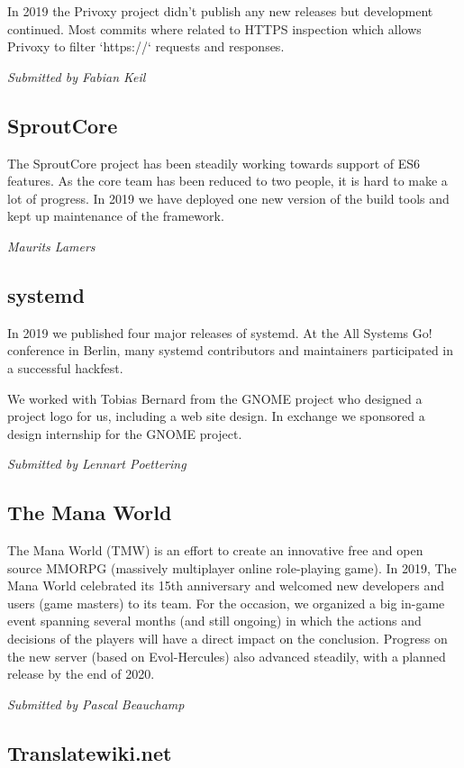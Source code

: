 \documentclass[a4paper]{report}
\begin{document}
In 2019 the Privoxy project didn't publish any new releases but
development continued. Most commits where related to HTTPS inspection
which allows Privoxy to filter `https://` requests and responses.

{\em Submitted by Fabian Keil}

\subsection{SproutCore}

The SproutCore project has been steadily working towards support of ES6
features.  As the core team has been reduced to two people, it is hard
to make a lot of progress.  In 2019 we have deployed one new version of
the build tools and kept up maintenance of the framework.

{\em Maurits Lamers }

\subsection{systemd}

In 2019 we published four major releases of systemd. At the All Systems
Go! conference in Berlin, many systemd contributors and maintainers
participated in a successful hackfest.

We worked with Tobias Bernard from the GNOME project who designed a
project logo for us, including a web site design. In exchange we
sponsored a design internship for the GNOME project.

{\em Submitted by Lennart Poettering}

\subsection{The Mana World}

The Mana World (TMW) is an effort to create an innovative free and open
source MMORPG (massively multiplayer online role-playing game).  In 2019,
The Mana World celebrated its 15th anniversary and welcomed new developers
and users (game masters) to its team. For the occasion, we organized a big
in-game event spanning several months (and still ongoing) in which the
actions and decisions of the players will have a direct impact on the
conclusion.  Progress on the new server (based on Evol-Hercules) also
advanced steadily, with a planned release by the end of 2020.

{\em Submitted by Pascal Beauchamp}

\subsection{Translatewiki.net}
\end{document}
